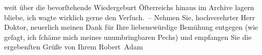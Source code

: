 \begin{ledgroupsized}[t]{13cm}
               weit über die bevorſtehende Wiedergeburt Öſterreichs hinaus im Archive lagern bliebe, ich wagte wirklich gerne den
               Verſuch. –\pend
           \pstart
           Nehmen Sie, hochverehrter Herr Doktor, neuerlich meinen Dank für Ihre liebenswürdige
               Bemühung entgegen (wie geſagt, ich ſchäme mich meines unumbringbaren Pechs) und
               empfangen Sie die ergebenſten Grüße von Ihrem\pend
           \pstart \spacefill\mbox{Robert Adam}\pend{}
         
         \endnumbering{}\end{ledgroupsized}  \newcommand{\dateiname}{L02260}\newcommand{\titel}{Robert Adam an Arthur Schnitzler, 16. 5. 1917}\newcommand{\editorInnen}{Martin Anton Müller und Gerd-Hermann Susen}
      